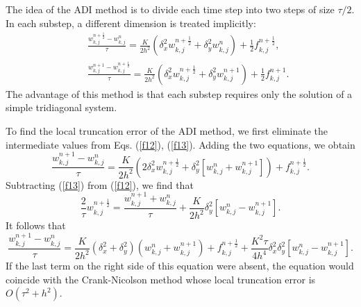 \vskip 0.3cm
 
The idea of the ADI method is to divide each time step into two
steps of size $\tau/2$. In each substep, a different dimension is treated
implicitly:
\begin{eqnarray}
&&\frac{w^{n+\frac{1}{2}}_{k,j}-w^{n}_{k,j}}{\tau}=\frac{K}{2h^2}
\left(\delta^2_{x}w^{n+\frac{1}{2}}_{k,j}
+\delta^2_{y}w^{n}_{k,j}\right)+\frac{1}{2}f^{n+\frac{1}{2}}_{k,j}, \label{f12} \\
&&\frac{w^{n+1}_{k,j}-w^{n+\frac{1}{2}}_{k,j}}{\tau}=\frac{K}{2h^2}
\left(\delta^2_{x}w^{n+\frac{1}{2}}_{k,j}
+\delta^2_{y}w^{n+1}_{k,j}\right)+\frac{1}{2}f^{n+1}_{k,j}. \label{f13}
\end{eqnarray}
The advantage of this method is that each substep requires only
the solution of a simple tridiagonal system.


\vskip 0.3cm
 
To find the local truncation error of the ADI method, we first eliminate
the intermediate values from Eqs. (\ref{f12}), (\ref{f13}). Adding the two equations, we
obtain
\[
\frac{w^{n+1}_{k,j}-w^{n}_{k,j}}{\tau}=\frac{K}{2h^2}
\left(2\delta^2_{x}w^{n+\frac{1}{2}}_{k,j}
+\delta^2_{y}\left[w^{n}_{k,j}+w^{n+1}_{k,j}\right]\right)+f^{n+\frac{1}{2}}_{k,j}.
\]
Subtracting (\ref{f13}) from (\ref{f12}), we find that
\[
\frac{2}{\tau}w^{n+\frac{1}{2}}_{k,j}=\frac{w^{n+1}_{k,j}+w^{n}_{k,j}}{\tau}+
\frac{K}{2h^2}\delta^2_{y}\left[w^{n}_{k,j}-w^{n+1}_{k,j}\right].
\]
It follows that
\begin{equation}
\frac{w^{n+1}_{k,j}-w^{n}_{k,j}}{\tau}=\frac{K}{2h^2}
\left(\delta^2_{x}+\delta^2_{y}\right)\left(
w^{n}_{k,j}+w^{n+1}_{k,j}\right)+f^{n+\frac{1}{2}}_{k,j}+
\frac{K^2\tau}{4h^4}\delta^2_{x}\delta^2_{y}
\left[w^{n}_{k,j}-w^{n+1}_{k,j}\right]. \label{f14}
\end{equation}
If the last term on the right side of this equation were absent, the equation
would coincide with the Crank-Nicolson method whose local truncation
error is $O(\tau^2+h^2)$.

\vskip 0.3cm
 
